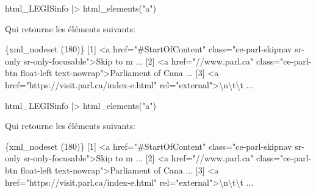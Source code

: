 \documentclass[
  letterpaper,
  DIV=11,
  numbers=noendperiod]{scrreprt}
\newenvironment{Shaded}{\begin{snugshade}}{\end{snugshade}}
\newcommand{\DataTypeTok}[1]{\textcolor[rgb]{0.68,0.00,0.00}{#1}}
\newcommand{\ErrorTok}[1]{\textcolor[rgb]{0.68,0.00,0.00}{#1}}
\newcommand{\ExtensionTok}[1]{\textcolor[rgb]{0.00,0.23,0.31}{#1}}
\newcommand{\KeywordTok}[1]{\textcolor[rgb]{0.00,0.23,0.31}{#1}}
\newcommand{\NormalTok}[1]{\textcolor[rgb]{0.00,0.23,0.31}{#1}}
\newcommand{\OperatorTok}[1]{\textcolor[rgb]{0.37,0.37,0.37}{#1}}
\newcommand{\StringTok}[1]{\textcolor[rgb]{0.13,0.47,0.30}{#1}}
\begin{document}
\begin{Shaded}
\begin{Highlighting}[]
\ExtensionTok{html\_LEGISinfo} \KeywordTok{|}\OperatorTok{\textgreater{}}\NormalTok{ html\_elements}\KeywordTok{(}\StringTok{"a"}\KeywordTok{)}
\end{Highlighting}
\end{Shaded}

Qui retourne les éléments suivants:

\begin{Shaded}
\begin{Highlighting}[]
\ExtensionTok{\{xml\_nodeset} \ErrorTok{(}\ExtensionTok{180}\KeywordTok{)}\ErrorTok{\}}
 \ExtensionTok{[1]} \OperatorTok{\textless{}}\NormalTok{a href=}\StringTok{"\#StartOfContent"}\NormalTok{ class=}\StringTok{"ce{-}parl{-}skipnav sr{-}only sr{-}only{-}focusable"}\OperatorTok{\textgreater{}}\NormalTok{Skip to m ...}
 \ExtensionTok{[2]} \OperatorTok{\textless{}}\NormalTok{a href=}\StringTok{"//www.parl.ca"}\NormalTok{ class=}\StringTok{"ce{-}parl{-}btn float{-}left text{-}nowrap"}\OperatorTok{\textgreater{}}\NormalTok{Parliament of Cana ...}
 \ExtensionTok{[3]} \OperatorTok{\textless{}}\NormalTok{a href=}\StringTok{"https://visit.parl.ca/index{-}e.html"}\NormalTok{ rel=}\StringTok{"external"}\OperatorTok{\textgreater{}}\DataTypeTok{\textbackslash{}n\textbackslash{}t\textbackslash{}t}\NormalTok{                    ...}
\end{Highlighting}
\end{Shaded}

\begin{Shaded}
\begin{Highlighting}[]
\ExtensionTok{html\_LEGISinfo} \KeywordTok{|}\OperatorTok{\textgreater{}}\NormalTok{ html\_elements}\KeywordTok{(}\StringTok{"a"}\KeywordTok{)}
\end{Highlighting}
\end{Shaded}

Qui retourne les éléments suivants:

\begin{Shaded}
\begin{Highlighting}[]
\ExtensionTok{\{xml\_nodeset} \ErrorTok{(}\ExtensionTok{180}\KeywordTok{)}\ErrorTok{\}}
 \ExtensionTok{[1]} \OperatorTok{\textless{}}\NormalTok{a href=}\StringTok{"\#StartOfContent"}\NormalTok{ class=}\StringTok{"ce{-}parl{-}skipnav sr{-}only sr{-}only{-}focusable"}\OperatorTok{\textgreater{}}\NormalTok{Skip to m ...}
 \ExtensionTok{[2]} \OperatorTok{\textless{}}\NormalTok{a href=}\StringTok{"//www.parl.ca"}\NormalTok{ class=}\StringTok{"ce{-}parl{-}btn float{-}left text{-}nowrap"}\OperatorTok{\textgreater{}}\NormalTok{Parliament of Cana ...}
 \ExtensionTok{[3]} \OperatorTok{\textless{}}\NormalTok{a href=}\StringTok{"https://visit.parl.ca/index{-}e.html"}\NormalTok{ rel=}\StringTok{"external"}\OperatorTok{\textgreater{}}\DataTypeTok{\textbackslash{}n\textbackslash{}t\textbackslash{}t}\NormalTok{                    ...}
\end{Highlighting}
\end{Shaded}
\end{document}
